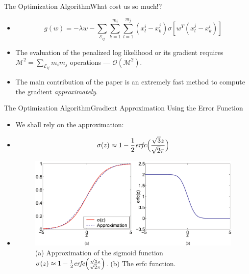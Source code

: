 \documentclass[8pt]{beamer}
\renewcommand{\|}[1][.3em]{\hspace{#1}|\hspace{#1}}
\renewcommand{\,}[1][.3em]{,\hspace{#1}}
\newlength{\wideitemsep}
\let\olditem\item
\renewcommand{\item}{\setlength{\itemsep}{\wideitemsep}\olditem}
\newcommand{\m}[1]{\mathcal{#1}}
\newcommand{\e}[1]{{\emph{#1}}}
\renewcommand{\,}{,\hspace{3pt}}
\renewcommand{\|}{\hspace{3pt}|\hspace{3pt}}
\newcommand{\erfc}{{\text{\textit{erfc}}}}
\renewcommand{\O}{\m{O}}
\begin{document}
\begin{frame}{The Optimization Algorithm}{What cost us so much!?}
    \begin{itemize}
    \item[] \begin{equation}
    g(w) = -\lambda w - \sum_{\m{E}_{ij}}\sum_{k = 1}^{m_i}\sum_{l = 1}^{m_j} (x_l^i - x_k^j)\sigma[w^T(x_l^j - x_k^i)]
    \end{equation}
    \item The evaluation of the penalized log likelihood or its gradient requires $\m{M}^2 = \sum_{\m{E}_{ij}}m_im_j$ operations --- $\O(\m{M}^2)$.
    \item The main contribution of the paper is an extremely fast method to compute the gradient \e{approximately}.
    \end{itemize}
\end{frame}

\begin{frame}{The Optimization Algorithm}{Gradient Approximation Using the Error Function}
    \begin{itemize}
    \item We shall rely on the approximation:
    \item[] \begin{equation}
    \sigma(z) \approx 1 - {1 \over 2} \erfc\Big({\sqrt{3} z \over \sqrt{2} \pi}\Big)
    \end{equation}
    \item[] \begin{figure}
    \centering
    \includegraphics[width=.8\textwidth]{sigma_approx}
    \caption{(a) Approximation of the sigmoid function $\sigma(z) \approx 1 - {1 \over 2} \erfc\Big({\sqrt{3} z \over \sqrt{2} \pi}\Big)$. (b) The erfc function.}
    \end{figure}
    \end{itemize}
\end{frame}
\end{document}
